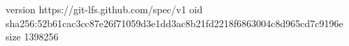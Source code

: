 version https://git-lfs.github.com/spec/v1
oid sha256:52b61cac3cc87e26f71059d3e1dd3ac8b21fd2218f6863004c8d965cd7c9196e
size 1398256
